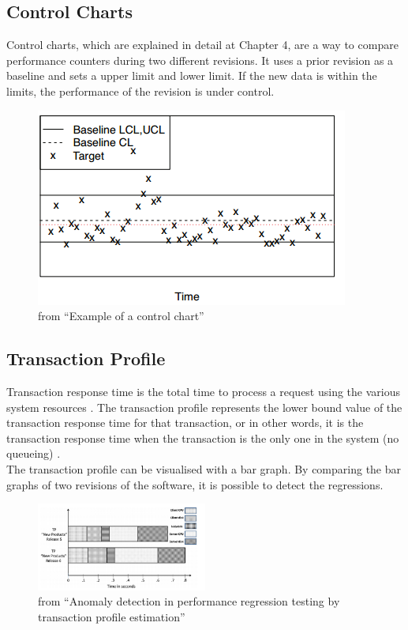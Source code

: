 \subsection{Control Charts}
Control charts, which are explained in detail at Chapter 4, are a way to compare performance counters during two different revisions. It uses a prior revision as a baseline and sets a upper limit and lower limit. If the new data is within the limits, the performance of the revision is under control.
\begin{figure}[h]
\begin{center}
  \includegraphics[scale=0.7]{Figures/controlchart.png}
\end{center}
  \caption{from ``Example of a control chart''\cite{nguyen2012using}}

\end{figure}

\subsection{Transaction Profile}
Transaction response time is the total time to process a request using the various
system resources \cite{jain2008art}. The transaction profile represents the lower bound value of the transaction response time for that transaction, or in other words, it is the
transaction response time when the transaction is the only one in the system (no queueing) \cite{ghaith2015anomaly}.\\
The transaction profile can be visualised with a bar graph. By comparing the bar graphs of two revisions of the software, it is possible to detect the regressions.

\begin{figure}[h]
\begin{center}
  \includegraphics[width=0.5\textwidth]{Figures/TP.png}
\end{center}
  \caption{from ``Anomaly detection in performance regression testing by transaction profile estimation''\cite{ghaith2015anomaly}}

\end{figure}

